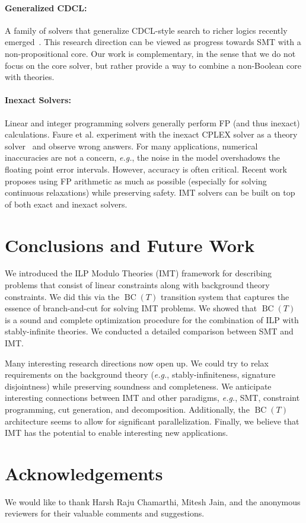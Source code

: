 \documentclass{llncs}
\newcommand{\comment}[1]{}
\newcommand{\eg}[0]{\emph{e.g.}, }
\newcommand{\bct}[0]{\ensuremath{\operatorname{BC}(T)}}
\begin{document}
\paragraph{Generalized CDCL:} A family of solvers that generalize
CDCL-style search to richer logics recently
emerged~\cite{cutsat,naturalsmt,richerdpll,mcsat}. This research
direction can be viewed as progress towards SMT with a
non-propositional core. Our work is complementary, in the sense that
we do not focus on the core solver, but rather provide a way to
combine a non-Boolean core with theories.



\paragraph{Inexact Solvers:} Linear and integer programming solvers
generally perform FP (and thus inexact) calculations. Faure et
al. experiment with the inexact CPLEX solver as a theory
solver~\cite{inexact}\comment{They observe that it does not handle
  well the small, incremental queries that an SMT solver performs,}
and observe wrong answers. For many applications, numerical
inaccuracies are not a concern, \eg the noise in the model overshadows
the floating point error intervals. \comment{or an answer close enough
  to the theoretical optimal suffices.} However, accuracy is often
critical. Recent work~\cite{safeboundsmip,exactrational} proposes
using FP arithmetic as much as possible (especially for solving
continuous relaxations) while preserving safety. \comment{that cutting
  planes, infeasibility certificates, and bounds obtained from
  relaxations are safe.} IMT solvers can be built on top of both exact
and inexact solvers.

\section{Conclusions and Future Work}
\label{sec:conclusions}

We introduced the ILP Modulo Theories (IMT) framework for describing
problems that consist of linear constraints along with background
theory constraints.  We did this via the \bct{} transition system that
captures the essence of branch-and-cut for solving IMT problems. We
showed that \bct{} is a sound and complete optimization procedure for
the combination of ILP with stably-infinite theories. We conducted a
detailed comparison between SMT and IMT.

Many interesting research directions now open up. We could try to
relax requirements on the background theory (\eg stably-infiniteness,
signature disjointness) while preserving soundness and
completeness. We anticipate interesting connections between IMT and
other paradigms, \eg SMT, constraint programming, cut generation, and
decomposition. Additionally, the \bct{} architecture seems to allow
for significant parallelization. Finally, we believe that IMT has the
potential to enable interesting new applications.

\section*{Acknowledgements}

We would like to thank Harsh Raju Chamarthi, Mitesh Jain, and the
anonymous reviewers for their valuable comments and suggestions.



\end{document}
